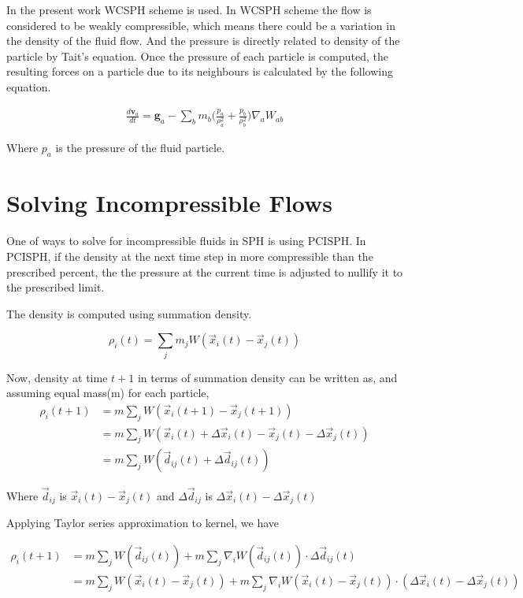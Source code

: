 In the present work WCSPH scheme is used. In WCSPH scheme the flow is
considered to be weakly compressible, which means there could be a variation
in the density of the fluid flow. And the pressure is directly related to density
of the particle by Tait's equation. Once the pressure of each particle is computed, the
resulting forces on a particle due to its neighbours is calculated by the following equation.

\begin{align}
  \label{eq:sph_momentum}
    \frac{d\textbf{v}_a}{dt} = \textbf{g}_a  -\sum_{b}m_b \Bigg(\frac{p_a}{\rho^2_a} + \frac{p_b}{\rho^2_b}\Bigg) \nabla_a W_{ab}
\end{align}

Where $p_a$ is the pressure of the fluid particle.


\section{Solving Incompressible Flows}
\label{sec:solv-incompr-flows}
One of ways to solve for incompressible fluids in SPH is using PCISPH. In
PCISPH, if the density at the next time step in more compressible than the
prescribed percent, the the pressure at the current time is adjusted to nullify
it to the prescribed limit.

The density is computed using summation density.

\begin{equation}
  \label{eq:summation_density}
  \rho_i(t) = \sum_j m_j W(\vec{x}_i(t) - \vec{x}_j(t))
\end{equation}

Now, density at time $t + 1$ in terms of summation density can be written as,
and assuming equal mass(m) for each particle,
\begin{align*}
  \rho_i(t+1) &= m \sum_j W(\vec{x}_i(t+1) -
                \vec{x}_j(t+1)) \\
              &= m \sum_j W(\vec{x}_i(t) + \Delta
                \vec{x}_i(t) - \vec{x}_j(t) - \Delta \vec{x}_j(t)) \\
              &= m \sum_j W(\vec{d}_{ij}(t) + \Delta \vec{d}_{ij}(t))
\end{align*}

Where $\vec{d}_{ij}$ is $\vec{x}_i(t) - \vec{x}_j(t)$ and
$\Delta \vec{d}_{ij}$ is $\Delta\vec{x}_i(t) -
\Delta\vec{x}_j(t)$


Applying Taylor series approximation to kernel, we have

\begin{align*}
  \rho_i(t+1) &= m \sum_j W(\vec{d}_{ij}(t)) + m \sum_j \nabla_i W(\vec{d}_{ij}(t)) \cdot \Delta \vec{d}_{ij}(t) \\
              &= m \sum_j W(\vec{x}_i(t) - \vec{x}_j(t)) + m \sum_j \nabla_i W(\vec{x}_i(t) -
                \vec{x}_j(t)) \cdot (\Delta\vec{x}_i(t) - \Delta\vec{x}_j(t))\\
\end{align*}


